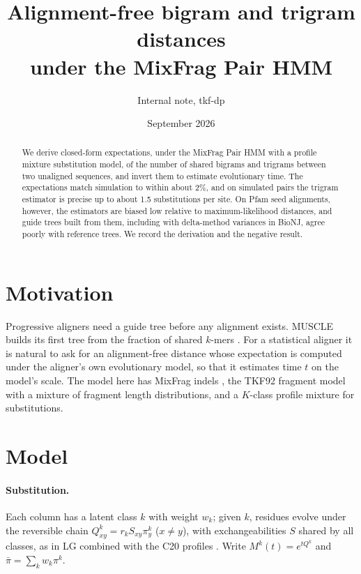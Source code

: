 \documentclass[11pt]{article}
\title{Alignment-free bigram and trigram distances\\under the MixFrag Pair HMM}
\author{Internal note, tkf-dp}
\date{September 2026}
\begin{document}
\maketitle

\begin{abstract}
We derive closed-form expectations, under the MixFrag Pair HMM with a profile
mixture substitution model, of the number of shared bigrams and trigrams
between two unaligned sequences, and invert them to estimate evolutionary
time. The expectations match simulation to within about 2\%, and on
simulated pairs the trigram estimator is precise up to about 1.5
substitutions per site. On Pfam seed alignments, however, the estimators are
biased low relative to maximum-likelihood distances, and guide trees built
from them, including with delta-method variances in BioNJ, agree poorly with
reference trees. We record the derivation and the negative result.
\end{abstract}

\section{Motivation}

Progressive aligners need a guide tree before any alignment exists. MUSCLE
builds its first tree from the fraction of shared $k$-mers
\citep{Edgar2004}. For a statistical aligner it is natural to ask for an
alignment-free distance whose expectation is computed under the aligner's own
evolutionary model, so that it estimates time $t$ on the model's scale. The
model here has MixFrag indels \citep{HolmesMixFrag}, the TKF92
\citep{ThorneKishinoFelsenstein1992} fragment model with a mixture of fragment
length distributions, and a $K$-class profile mixture for substitutions.

\section{Model}

\paragraph{Substitution.} Each column has a latent class $k$ with weight
$w_k$; given $k$, residues evolve under the reversible chain
$Q^k_{xy}=r_kS_{xy}\pi^k_y$ ($x\ne y$), with exchangeabilities $S$ shared by
all classes, as in LG \citep{LeGascuel2008} combined with the C20 profiles
\citep{LeGascuelLartillot2008}. Write $M^k(t)=e^{tQ^k}$ and
$\bar\pi=\sum_kw_k\pi^k$.
\end{document}
